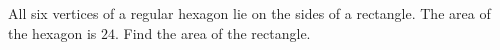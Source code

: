 All six vertices of a regular hexagon lie on the sides of a rectangle. The area of the hexagon is $24$. Find the area of the rectangle.
